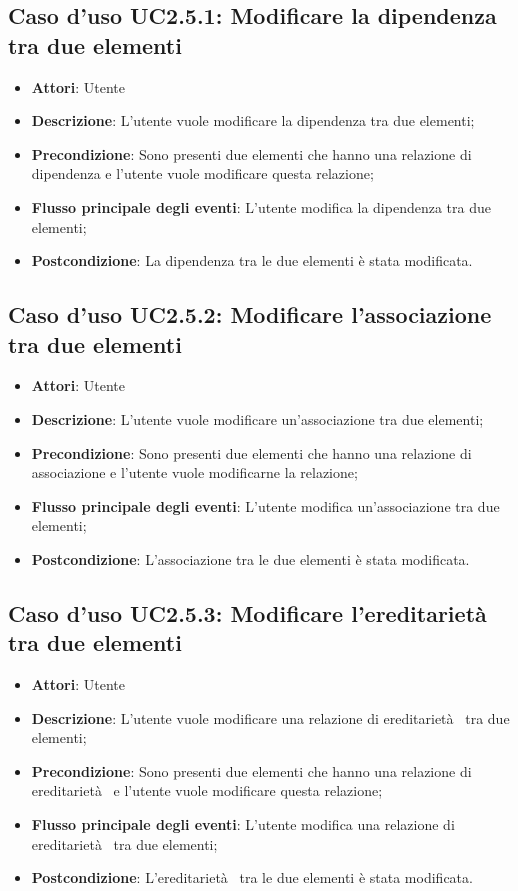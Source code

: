 \documentclass[../AnalisiDeiRequisiti.tex]{subfiles}
\begin{document}
		\subsection{Caso d'uso UC2.5.1: Modificare la dipendenza tra due elementi}
		\begin{itemize}
			\item \textbf{Attori}: Utente
			\item \textbf{Descrizione}: L'utente vuole modificare la dipendenza tra due elementi;
			\item \textbf{Precondizione}: Sono presenti due elementi che hanno una relazione di dipendenza e l'utente vuole modificare questa relazione;
			\item \textbf{Flusso principale degli eventi}: L'utente modifica la dipendenza tra due elementi;
			\item \textbf{Postcondizione}: La dipendenza tra le due elementi è stata modificata.
		\end{itemize}
		\subsection{Caso d'uso UC2.5.2: Modificare l'associazione tra due elementi}
		\begin{itemize}
			\item \textbf{Attori}: Utente
			\item \textbf{Descrizione}: L'utente vuole modificare un'associazione tra due elementi;
			\item \textbf{Precondizione}: Sono presenti due elementi che hanno una relazione di associazione e l'utente vuole modificarne la relazione;
			\item \textbf{Flusso principale degli eventi}: L'utente modifica un'associazione tra due elementi;
			\item \textbf{Postcondizione}: L'associazione tra le due elementi è stata modificata.
		\end{itemize}
		\subsection{Caso d'uso UC2.5.3: Modificare l'ereditarietà  tra due elementi}
		\begin{itemize}
			\item \textbf{Attori}: Utente
			\item \textbf{Descrizione}: L'utente vuole modificare una relazione di ereditarietà  tra due elementi;
			\item \textbf{Precondizione}: Sono presenti due elementi che hanno una relazione di ereditarietà  e l'utente vuole modificare questa relazione;
			\item \textbf{Flusso principale degli eventi}: L'utente modifica una relazione di ereditarietà  tra due elementi;
			\item \textbf{Postcondizione}: L'ereditarietà  tra le due elementi è stata modificata.
		\end{itemize}
\end{document}
